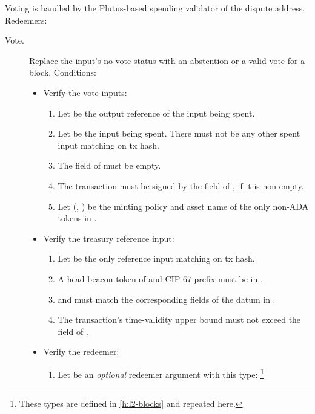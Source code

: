 \documentclass[../hydrozoa.tex]{subfiles}
\begin{document}
Voting is handled by the Plutus-based spending validator of the dispute address.
Redeemers:
\begin{description}
  \item[Vote.] Replace the input's no-vote status with an abstention or a valid vote for a block.
  Conditions:
    \begin{itemize}
      \item Verify the vote inputs:
        \begin{enumerate}
          \item Let  be the output reference of the input being spent.
          \item Let  be the input being spent.
            There must not be any other spent input matching  on tx hash.
          \item The  field of  must be empty.
          \item The transaction must be signed by the  field of , if it is non-empty.
          \item Let (, ) be the minting policy and asset name of the only non-ADA tokens in .
        \end{enumerate}
      \item Verify the treasury reference input:
        \begin{enumerate}[resume]
          \item Let  be the only reference input matching  on tx hash.
          \item A head beacon token of  and CIP-67 prefix \headBeaconToken{} must be in .
          \item {} and  must match the corresponding fields of the  datum in .
          \item The transaction's time-validity upper bound must not exceed the  field of .
        \end{enumerate}
      \item Verify the redeemer:
        \begin{enumerate}[resume]
          \item Let  be an \emph{optional} redeemer argument with this type:%
            \footnote{These types are defined in \cref{h:l2-blocks} and repeated here.}
            \begin{equation*}

\end{equation*}
\end{enumerate}
\end{itemize}
\end{description}
\end{document}
